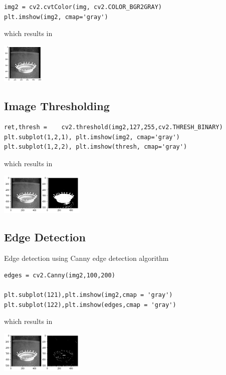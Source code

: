 \begin{verbatim}
img2 = cv2.cvtColor(img, cv2.COLOR_BGR2GRAY)
plt.imshow(img2, cmap='gray')
\end{verbatim}

which results in 

\includegraphics[width=0.15\textwidth]{opencv_files/output_11_1.png}


\subsection{Image Thresholding}\label{image-thresholding}

\begin{verbatim}
ret,thresh =    cv2.threshold(img2,127,255,cv2.THRESH_BINARY)
plt.subplot(1,2,1), plt.imshow(img2, cmap='gray')
plt.subplot(1,2,2), plt.imshow(thresh, cmap='gray')
\end{verbatim}

which results in 

\includegraphics[width=0.3\textwidth]{opencv_files/output_13_1.png}


\subsection{Edge Detection}\label{edge-detection}

Edge detection using Canny edge detection algorithm

\begin{verbatim}
edges = cv2.Canny(img2,100,200)

plt.subplot(121),plt.imshow(img2,cmap = 'gray')
plt.subplot(122),plt.imshow(edges,cmap = 'gray')
\end{verbatim}

which results in 

\includegraphics[width=0.3\textwidth]{opencv_files/output_15_1.png}


